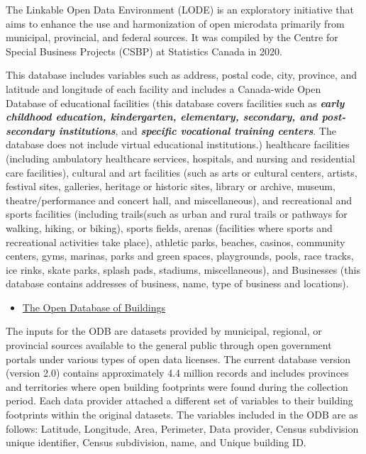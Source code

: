 \documentclass[
11pt, %
oneside, %
english, %
singlespacing, %
]{macthesis} %
\def\tightlist{}
\begin{document}
The Linkable Open Data Environment (LODE) is an exploratory initiative that aims to enhance the use and harmonization of open microdata primarily from municipal, provincial, and federal sources. It was compiled by the Centre for Special Business Projects (CSBP) at Statistics Canada in 2020.

This database includes variables such as address, postal code, city, province, and latitude and longitude of each facility and includes a Canada-wide Open Database of educational facilities (this database covers facilities such as \textbf{\emph{early childhood education, kindergarten, elementary, secondary, and post-secondary institutions}}, and \textbf{\emph{specific vocational training centers}}. The database does not include virtual educational institutions.) healthcare facilities (including ambulatory healthcare services, hospitals, and nursing and residential care facilities), cultural and art facilities (such as arts or cultural centers, artists, festival sites, galleries, heritage or historic sites, library or archive, museum, theatre/performance and concert hall, and miscellaneous), and recreational and sports facilities (including trails(such as urban and rural trails or pathways for walking, hiking, or biking), sports fields, arenas (facilities where sports and recreational activities take place), athletic parks, beaches, casinos, community centers, gyms, marinas, parks and green spaces, playgrounds, pools, race tracks, ice rinks, skate parks, splash pads, stadiums, miscellaneous), and Businesses (this database contains addresses of business, name, type of business and locations).

\begin{itemize}
\tightlist
\item
  \href{https://www.statcan.gc.ca/en/lode/databases/odb}{The Open Database of Buildings}
\end{itemize}

The inputs for the ODB are datasets provided by municipal, regional, or provincial sources available to the general public through open government portals under various types of open data licenses. The current database version (version 2.0) contains approximately 4.4 million records and includes provinces and territories where open building footprints were found during the collection period. Each data provider attached a different set of variables to their building footprints within the original datasets. The variables included in the ODB are as follows: Latitude, Longitude, Area, Perimeter, Data provider, Census subdivision unique identifier, Census subdivision, name, and Unique building ID.
\end{document}
